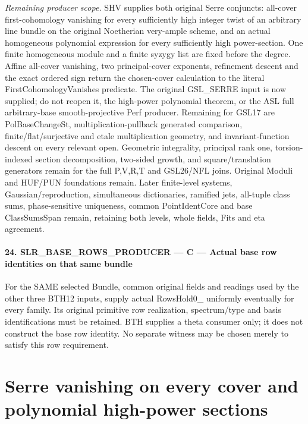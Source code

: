 \documentclass[11pt,a4paper]{article}
\numberwithin{equation}{section}
\theoremstyle{remark}\newtheorem{remark}[theorem]{Remark}
\begin{document}
\emph{Remaining producer scope.} SHV supplies both original Serre conjuncts: all-cover first-cohomology vanishing for every sufficiently high integer twist of an arbitrary line bundle on the original Noetherian very-ample scheme, and an actual homogeneous polynomial expression for every sufficiently high power-section. One finite homogeneous module and a finite syzygy list are fixed before the degree. Affine all-cover vanishing, two principal-cover exponents, refinement descent and the exact ordered sign return the chosen-cover calculation to the literal FirstCohomologyVanishes predicate. The original GSL\_\allowbreak SERRE input is now supplied; do not reopen it, the high-power polynomial theorem, or the ASL full arbitrary-base smooth-projective Perf producer. Remaining for GSL17 are PolBaseChangeSt, multiplication-pullback generated comparison, finite/flat/surjective and etale multiplication geometry, and invariant-function descent on every relevant open. Geometric integrality, principal rank one, torsion-indexed section decomposition, two-sided growth, and square/translation generators remain for the full P,V,R,T and GSL26/NFL joins. Original Moduli and HUF/PUN foundations remain. Later finite-level systems, Gaussian/reproduction, simultaneous dictionaries, ramified jets, all-tuple class sums, phase-sensitive uniqueness, common PointIdentCore and base ClassSumsSpan remain, retaining both levels, whole fields, Fits and eta agreement.



\paragraph{24. SLR\_\allowbreak BASE\_\allowbreak ROWS\_\allowbreak PRODUCER — C — Actual base row identities on that same bundle}

For the SAME selected Bundle, common original fields and readings used by the other three BTH12 inputs, supply actual RowsHold0\_ uniformly eventually for every family. Its original primitive row realization, spectrum/type and basis identifications must be retained. BTH supplies a theta consumer only; it does not construct the base row identity. No separate witness may be chosen merely to satisfy this row requirement.



\clearpage
\section{Serre vanishing on every cover and polynomial high-power sections}
\label{sec:serre-h1-v055}
\end{document}
